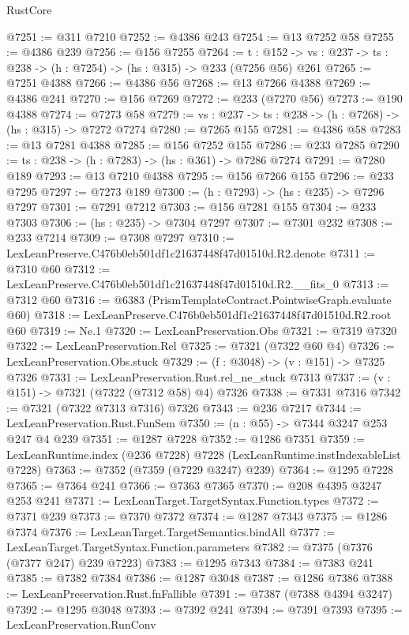 \begin{lexlean}{RustCore}
\begin{coremodule}
@7251 := @311 @7210
@7252 := @4386 @243
@7254 := @13 @7252 @58
@7255 := @4386 @239
@7256 := @156 @7255
@7264 := {t : @152} ->
  {vs : @237} -> {ts : @238} -> (h : @7254) -> (hs : @315) -> @233 (@7256 @56) @261
@7265 := @7251 @4388
@7266 := @4386 @56
@7268 := @13 @7266 @4388
@7269 := @4386 @241
@7270 := @156 @7269
@7272 := @233 (@7270 @56)
@7273 := @190 @4388
@7274 := @7273 @58
@7279 := {vs : @237} -> {ts : @238} -> (h : @7268) -> (hs : @315) -> @7272 @7274
@7280 := @7265 @155
@7281 := @4386 @58
@7283 := @13 @7281 @4388
@7285 := @156 @7252 @155
@7286 := @233 @7285
@7290 := {ts : @238} -> (h : @7283) -> (hs : @361) -> @7286 @7274
@7291 := @7280 @189
@7293 := @13 @7210 @4388
@7295 := @156 @7266 @155
@7296 := @233 @7295
@7297 := @7273 @189
@7300 := (h : @7293) -> (hs : @235) -> @7296 @7297
@7301 := @7291 @7212
@7303 := @156 @7281 @155
@7304 := @233 @7303
@7306 := (hs : @235) -> @7304 @7297
@7307 := @7301 @232
@7308 := @233 @7214
@7309 := @7308 @7297
@7310 := LexLeanPreserve.C476b0eb501df1c21637448f47d01510d.R2.denote
@7311 := @7310 @60
@7312 := LexLeanPreserve.C476b0eb501df1c21637448f47d01510d.R2.__fits_0
@7313 := @7312 @60
@7316 := @6383 (PrismTemplateContract.PointwiseGraph.evaluate @60)
@7318 := LexLeanPreserve.C476b0eb501df1c21637448f47d01510d.R2.root @60
@7319 := Ne.{1}
@7320 := LexLeanPreservation.Obs
@7321 := @7319 @7320
@7322 := LexLeanPreservation.Rel
@7325 := @7321 (@7322 @60 @4)
@7326 := LexLeanPreservation.Obs.stuck
@7329 := (f : @3048) -> (v : @151) -> @7325 @7326
@7331 := LexLeanPreservation.Rust.rel_ne_stuck @7313
@7337 := (v : @151) -> @7321 (@7322 (@7312 @58) @4) @7326
@7338 := @7331 @7316
@7342 := @7321 (@7322 @7313 @7316) @7326
@7343 := @236 @7217
@7344 := LexLeanPreservation.Rust.FunSem
@7350 := (n : @55) -> @7344 @3247 @253 @247 @4 @239
@7351 := @1287 @7228
@7352 := @1286 @7351
@7359 := LexLeanRuntime.index (@236 @7228) @7228 (LexLeanRuntime.instIndexableList @7228)
@7363 := @7352 (@7359 (@7229 @3247) @239)
@7364 := @1295 @7228
@7365 := @7364 @241
@7366 := @7363 @7365
@7370 := @208 @4395 @3247 @253 @241
@7371 := LexLeanTarget.TargetSyntax.Function.types
@7372 := @7371 @239
@7373 := @7370 @7372
@7374 := @1287 @7343
@7375 := @1286 @7374
@7376 := LexLeanTarget.TargetSemantics.bindAll
@7377 := LexLeanTarget.TargetSyntax.Function.parameters
@7382 := @7375 (@7376 (@7377 @247) @239 @7223)
@7383 := @1295 @7343
@7384 := @7383 @241
@7385 := @7382 @7384
@7386 := @1287 @3048
@7387 := @1286 @7386
@7388 := LexLeanPreservation.Rust.fnFallible
@7391 := @7387 (@7388 @4394 @3247)
@7392 := @1295 @3048
@7393 := @7392 @241
@7394 := @7391 @7393
@7395 := LexLeanPreservation.RunConv

\end{coremodule}
\end{lexlean}
